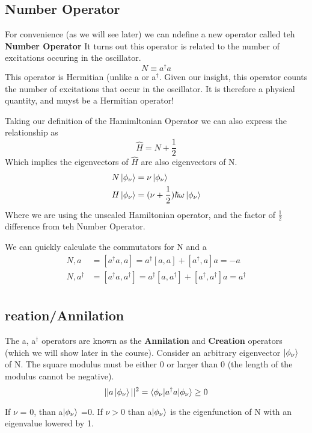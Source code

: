 \documentclass{article}
\newcommand{\be}{\begin{equation}}
\newcommand{\ee}{\end{equation}}
\newcommand{\dg}{\dagger}
\begin{document}
\subsection*{Number Operator}
For convenience (as we will see later) we can ndefine a new operator called teh \textbf{Number Operator}
It turns out this operator is related to the number of excitations occuring in the oscillator. 
\be
N \equiv a^\dg a
\ee
This operator is Hermitian (unlike a or a$^\dg$.
Given our insight, this operator counts the number of excitations that occur in the oscillator.
It is therefore a physical quantity, and muyst be a Hermitian operator!	

Taking our definition of the Hamimltonian Operator we can also express the relationship as
\be
\hat{H} = N + \frac{1}{2}
\ee
Which implies the eigenvectors of $\hat{H}$ are also eigenvectors of N. 
\be
\begin{split}
N\ket{\phi_\nu} &= \nu \ket{\phi_\nu}\\
H\ket{\phi_\nu} &= (\nu+\frac{1}{2})\hbar\omega \ket{\phi_\nu}\\
\end{split}
\ee
Where we are using the unscaled Hamiltonian operator, and the factor of $\frac{1}{2}$ difference from teh Number Operator.

We can quickly calculate the commutators for N and a
\be
\begin{split}
{N,a} &= [a^\dg a, a] = a^\dg[a,a] + [a^\dg,a]a = -a\\
{N,a^\dg} &= [a^\dg a, a^\dg] = a^\dg[a,a^\dg] + [a^\dg,a^\dg]a = a^\dg\\
\end{split}
\ee

\subsection*{reation/Annilation}
The a, a$^\dg$ operators are known as the \textbf{Annilation} and \textbf{Creation} operators (which we will show later in the course).
Consider an arbitrary eigenvector $\ket{\phi_\nu}$ of N.
The square modulus must be either 0 or larger than 0 (the length of the modulus cannot be negative).
\be
||a\ket{\phi_\nu}||^2 = \braket{\phi_\nu|a^\dg a| \phi_\nu} \geq 0
\ee

If $\nu$ = 0, than a$\ket{\phi_\nu}$ =0.
If $\nu > 0$ than a$\ket{\phi_\nu}$ is the eigenfunction of N with an eigenvalue lowered by 1. 
\end{document}
